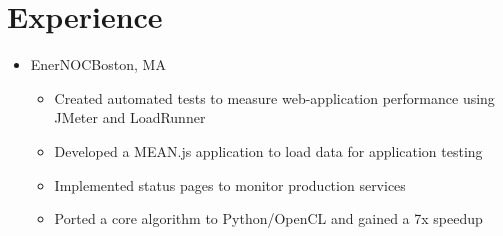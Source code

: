 \documentclass[11pt,letterpaper,sans]{moderncv}
\begin{document}
\section{Experience}

\vspace{6pt}

\begin{itemize}


\item[] {
{EnerNOC}{Boston, MA}{}{\vspace{3pt}}
\vspace{-3mm}	\begin{itemize}
	 \item Created automated tests to measure 
web-application performance using JMeter and LoadRunner
	 \item Developed a MEAN.js application to load data for application testing
	 \item Implemented status pages to monitor production services
	 \item Ported a core algorithm to Python/OpenCL and gained a 7x speedup
	\end{itemize}
}
\vspace{6pt}



\end{itemize}
\end{document}
